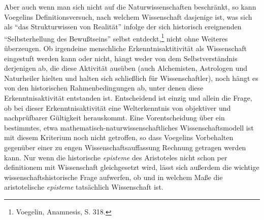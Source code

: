 Aber auch wenn man sich nicht auf die Naturwissenschaften beschränkt, so kann
Voegelins Definitionsversuch, nach welchem Wissenschaft dasjenige ist, was
sich als "`das Strukturwissen von Realität"' infolge der sich historisch
ereignenden "`Selbsterhellung des Bewußtseins"' selbst
entdeckt,\footnote{Voegelin, Anamnesis, S. 318.} nicht ohne Weiteres
überzeugen. Ob irgendeine menschliche Erkenntnisaktitivität als Wissenschaft
eingestuft werden kann oder nicht, hängt weder von dem Selbstverständnis
derjenigen ab, die diese Aktivität ausüben (auch Alchemisten, Astrologen und
Naturheiler hielten und halten sich schließlich für Wissenschaftler), noch
hängt es von den historischen Rahmenbedingungen ab, unter denen diese
Erkenntnisaktivität entstanden ist. Entscheidend ist einzig und allein die
Frage, ob bei dieser Erkenntnisaktivität eine Welterkenntnis von objektiver
und nachprüfbarer Gültigkeit herauskommt. Eine Vorentscheidung über ein
bestimmtes, etwa mathematisch-naturwissenschaftliches Wissenschaftsmodell ist
mit diesem Kriterium noch nicht getroffen, so dass Voegelins Vorbehalten
gegenüber einer zu engen Wissenschaftsauf\/fassung Rechnung getragen werden
kann. Nur wenn die historische {\it episteme} des Aristoteles nicht schon per
definitionem mit Wissenschaft gleichgesetzt wird, lässt sich außerdem die
wichtige wissenschaftshistorische Frage aufwerfen, ob und in welchem Maße die
aristotelische {\it episteme} tatsächlich Wissenschaft ist.

